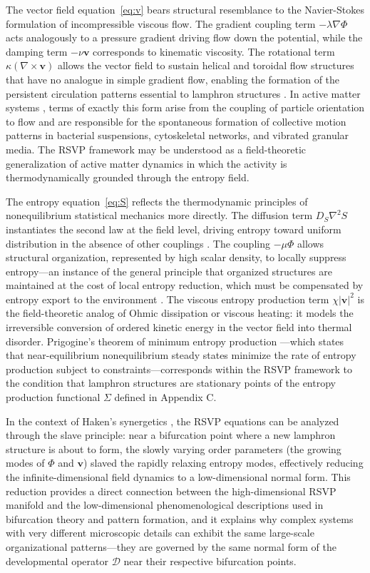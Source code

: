 \documentclass[12pt]{article}
\begin{document}
The vector field equation~\eqref{eq:v} bears structural resemblance to the Navier-Stokes formulation of incompressible viscous flow. The gradient coupling term $-\lambda \nabla \Phi$ acts analogously to a pressure gradient driving flow down the potential, while the damping term $-\nu \mathbf{v}$ corresponds to kinematic viscosity. The rotational term $\kappa(\nabla \times \mathbf{v})$ allows the vector field to sustain helical and toroidal flow structures that have no analogue in simple gradient flow, enabling the formation of the persistent circulation patterns essential to lamphron structures \cite{haken1983}. In active matter systems \cite{nicolis1977}, terms of exactly this form arise from the coupling of particle orientation to flow and are responsible for the spontaneous formation of collective motion patterns in bacterial suspensions, cytoskeletal networks, and vibrated granular media. The RSVP framework may be understood as a field-theoretic generalization of active matter dynamics in which the activity is thermodynamically grounded through the entropy field.

The entropy equation~\eqref{eq:S} reflects the thermodynamic principles of nonequilibrium statistical mechanics more directly. The diffusion term $D_S \nabla^2 S$ instantiates the second law at the field level, driving entropy toward uniform distribution in the absence of other couplings \cite{jaynes1957,cover2006}. The coupling $-\mu \Phi$ allows structural organization, represented by high scalar density, to locally suppress entropy---an instance of the general principle that organized structures are maintained at the cost of local entropy reduction, which must be compensated by entropy export to the environment \cite{prigogine1984}. The viscous entropy production term $\chi|\mathbf{v}|^2$ is the field-theoretic analog of Ohmic dissipation or viscous heating: it models the irreversible conversion of ordered kinetic energy in the vector field into thermal disorder. Prigogine's theorem of minimum entropy production \cite{prigogine1984,nicolis1977}---which states that near-equilibrium nonequilibrium steady states minimize the rate of entropy production subject to constraints---corresponds within the RSVP framework to the condition that lamphron structures are stationary points of the entropy production functional $\Sigma$ defined in Appendix C.

In the context of Haken's synergetics \cite{haken1983}, the RSVP equations can be analyzed through the slave principle: near a bifurcation point where a new lamphron structure is about to form, the slowly varying order parameters (the growing modes of $\Phi$ and $\mathbf{v}$) slaved the rapidly relaxing entropy modes, effectively reducing the infinite-dimensional field dynamics to a low-dimensional normal form. This reduction provides a direct connection between the high-dimensional RSVP manifold and the low-dimensional phenomenological descriptions used in bifurcation theory and pattern formation, and it explains why complex systems with very different microscopic details can exhibit the same large-scale organizational patterns---they are governed by the same normal form of the developmental operator $\mathcal{D}$ near their respective bifurcation points.
\end{document}
